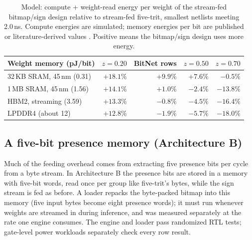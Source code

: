 \documentclass[11pt]{article}
\begin{document}
\begin{table}[h]
\centering
\caption{Model: compute + weight-read energy per weight of the stream-fed bitmap/sign design relative to stream-fed five-trit, smallest netlists meeting 2.0\,ns. Compute energies are simulated; memory energies per bit are published or literature-derived values \cite{horowitz2014energy,oconnor2017fgdram,ha2018dram}. Positive means the bitmap/sign design uses more energy.}
\label{tab:memory}
\begin{tabular}{lrrrr}
\toprule
Weight memory (pJ/bit) & $z=0.20$ & BitNet rows & $z=0.50$ & $z=0.70$ \\
\midrule
32\,KB SRAM, 45\,nm (0.31) & $+18.1\%$ & $+9.9\%$ & $+7.6\%$ & $-0.5\%$ \\
1\,MB SRAM, 45\,nm (1.56) & $+14.1\%$ & $+1.0\%$ & $-2.4\%$ & $-13.8\%$ \\
HBM2, streaming (3.59) & $+13.3\%$ & $-0.8\%$ & $-4.5\%$ & $-16.4\%$ \\
LPDDR4 (about 12) & $+12.8\%$ & $-1.9\%$ & $-5.7\%$ & $-18.0\%$ \\
\bottomrule
\end{tabular}
\end{table}

\subsection{A five-bit presence memory (Architecture B)}

Much of the feeding overhead comes from extracting five presence bits per
cycle from a byte stream. In Architecture B the presence bits are stored in a
memory with five-bit words, read once per group like five-trit's bytes, while
the sign stream is fed as before. A loader repacks the byte-packed bitmap into
this memory (five input bytes become eight presence words); it must run
whenever weights are streamed in during inference, and was measured
separately at the rate one engine consumes. The engine and loader pass randomized RTL tests; gate-level power workloads separately check every row result.
\end{document}
